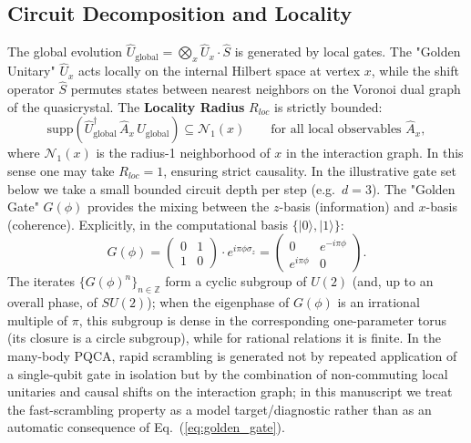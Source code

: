 \subsection{Circuit Decomposition and Locality}
The global evolution $\hat{U}_{\text{global}} = \bigotimes_x \hat{U}_x \cdot \hat{S}$ is generated by local gates. The "Golden Unitary" $\hat{U}_x$ acts locally on the internal Hilbert space at vertex $x$, while the shift operator $\hat{S}$ permutes states between nearest neighbors on the Voronoi dual graph of the quasicrystal.
The \textbf{Locality Radius} $R_{loc}$ is strictly bounded:
\begin{equation}
    \mathrm{supp}\!\left(\hat{U}_{\text{global}}^{\dagger}\,\hat{A}_x\,\hat{U}_{\text{global}}\right)\subseteq \mathcal{N}_1(x)\qquad\text{for all local observables }\hat{A}_x,
\end{equation}
where $\mathcal{N}_1(x)$ is the radius-1 neighborhood of $x$ in the interaction graph. In this sense one may take $R_{loc}=1$, ensuring strict causality. In the illustrative gate set below we take a small bounded circuit depth per step (e.g.\ $d=3$). The "Golden Gate" $G(\phi)$ provides the mixing between the $z$-basis (information) and $x$-basis (coherence). Explicitly, in the computational basis $\{|0\rangle, |1\rangle\}$:
\begin{equation}
    G(\phi) = \begin{pmatrix} 0 & 1 \\ 1 & 0 \end{pmatrix} \cdot e^{i \pi \phi \sigma_z} = \begin{pmatrix} 0 & e^{-i\pi\phi} \\ e^{i\pi\phi} & 0 \end{pmatrix}.
\label{eq:golden_gate}
\end{equation}
The iterates $\{G(\phi)^n\}_{n\in\mathbb{Z}}$ form a cyclic subgroup of $U(2)$ (and, up to an overall phase, of $SU(2)$); when the eigenphase of $G(\phi)$ is an irrational multiple of $\pi$, this subgroup is dense in the corresponding one-parameter torus (its closure is a circle subgroup), while for rational relations it is finite. In the many-body PQCA, rapid scrambling is generated not by repeated application of a single-qubit gate in isolation but by the combination of non-commuting local unitaries and causal shifts on the interaction graph; in this manuscript we treat the fast-scrambling property as a model target/diagnostic rather than as an automatic consequence of Eq.~(\ref{eq:golden_gate}).

